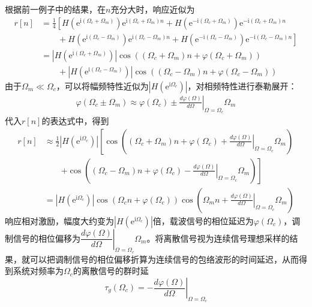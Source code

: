 \begin{example}
    根据前一例子中的结果，在$n$充分大时，响应近似为
    \begin{align*}
        r[n]&=\frac{1}{4}\left[H(\mathrm{e}^{\mathrm{i}(\Omega_c+\Omega_m)})\mathrm{e}^{\mathrm{i}(\Omega_c+\Omega_m)n}+H(\mathrm{e}^{-\mathrm{i}(\Omega_c+\Omega_m)})\mathrm{e}^{-\mathrm{i}(\Omega_c+\Omega_m)n}\right.\\
        &\qquad +\left.H(\mathrm{e}^{\mathrm{i}(\Omega_c-\Omega_m)})\mathrm{e}^{\mathrm{i}(\Omega_c-\Omega_m)n}+H(\mathrm{e}^{-\mathrm{i}(\Omega_c-\Omega_m)})\mathrm{e}^{-\mathrm{i}(\Omega_c-\Omega_m)n}\right]\\
        &=|H(\mathrm{e}^{\mathrm{i}(\Omega_c+\Omega_m)})|\cos((\Omega_c+\Omega_m)n+\varphi(\Omega_c+\Omega_m))\\
        &\qquad +|H(\mathrm{e}^{\mathrm{i}(\Omega_c-\Omega_m)})|\cos((\Omega_c-\Omega_m)n+\varphi(\Omega_c-\Omega_m))
    \end{align*}
    由于$\Omega_m\ll\Omega_c$，可以将幅频特性近似为$|H(\mathrm{e}^{\mathrm{i}\Omega_c})|$，对相频特性进行泰勒展开：
    \begin{align*}
        \varphi(\Omega_c\pm\Omega_m)\approx \varphi(\Omega_c)\pm \left.\frac{d\varphi(\Omega)}{d\Omega}\right|_{\Omega=\Omega_c}\Omega_m
    \end{align*}
    代入$r[n]$的表达式中，得到
    \begin{align*}
        r[n]&\approx \frac{1}{2}|H(\mathrm{e}^{\mathrm{i}\Omega_c})|\left[\cos\left((\Omega_c+\Omega_m)n+\varphi(\Omega_c)+\left.\frac{d\varphi(\Omega)}{d\Omega}\right|_{\Omega=\Omega_c}\Omega_m\right)\right.\\
        &\qquad\left.+\cos\left((\Omega_c-\Omega_m)n+\varphi(\Omega_c)-\left.\frac{d\varphi(\Omega)}{d\Omega}\right|_{\Omega=\Omega_c}\Omega_m\right)\right]\\
        &=|H(\mathrm{e}^{\mathrm{i}\Omega_c})|\cos\left(\Omega_c n+\varphi(\Omega_c)\right)\cos\left(\Omega_m n+\left.\frac{d\varphi(\Omega)}{d\Omega}\right|_{\Omega=\Omega_c}\Omega_m\right)
    \end{align*}
    响应相对激励，幅度大约变为$|H(\mathrm{e}^{\mathrm{i}\Omega_c})|$倍，载波信号的相位延迟为$\varphi(\Omega_c)$，调制信号的相位偏移为$\left.\dfrac{d\varphi(\Omega)}{d\Omega}\right|_{\Omega=\Omega_c}\Omega_m$。将离散信号视为连续信号理想采样的结果，就可以把调制信号的相位偏移折算为连续信号的包络波形的时间延迟，从而得到系统对频率为$\Omega_c$的离散信号的群时延
    $$\tau_g(\Omega_c)=-\left.\frac{d\varphi(\Omega)}{d\Omega}\right|_{\Omega=\Omega_c}$$
\end{example}

